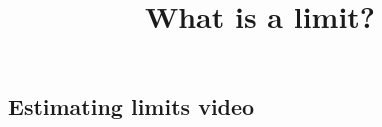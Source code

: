 \documentclass{ximera}
\title{What is a limit?}
\begin{document}
\begin{abstract}
\end{abstract}

\subsection{Estimating limits video}
\begin{center}
\end{center}
\end{document}
